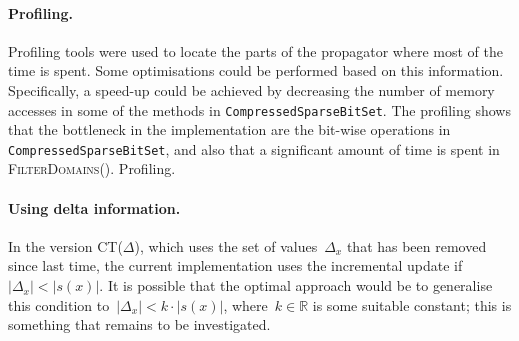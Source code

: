 \documentclass[a4paper,11pt]{article}
\newcommand{\Todo}[1]{{\color{blue}#1}}
\newcommand{\SparseBitSet}{\texttt{CompressedSparseBitSet}}
\def\FilterDomains{\textsc{FilterDomains}}
\numberwithin{equation}{section}
\begin{document}
\paragraph{Profiling.} Profiling tools were used to locate the parts of
the propagator where most of the time is spent. Some optimisations could
be performed based on this information. Specifically, a speed-up could be
achieved by decreasing the number of memory accesses in some of the
methods in \SparseBitSet. The profiling shows that the bottleneck 
in the implementation are the bit-wise operations in \SparseBitSet,
and also that a significant amount of time is spent in \FilterDomains().
\Todo{Profiling.}

\paragraph{Using delta information.} In the version CT($\Delta$), which uses
the set of values~$\Delta_x$ that has been removed since last time, the current
implementation uses the incremental update if~$|\Delta_x| < |s(x)|$. 
It is possible that the optimal approach would be to generalise this condition
to~$|\Delta_x| < k \cdot |s(x)|$, where~$k \in \mathbb{R}$ is some suitable constant;
this is something that remains to be investigated.


\end{document}
